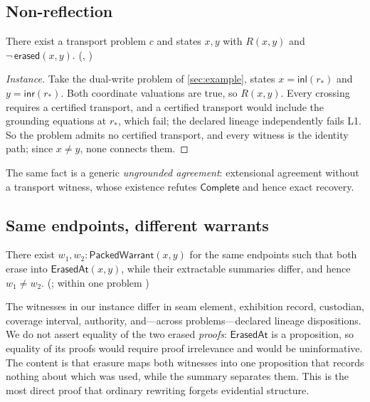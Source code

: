 \subsection{Non-reflection}
\begin{theorem}\label{thm:nonreflect}
There exist a transport problem $c$ and states $x,y$ with $R(x,y)$ and $\neg\,\mathsf{erased}(x,y)$. (, )
\end{theorem}
\begin{proof}[Instance]
Take the dual-write problem of \cref{sec:example}, states $x = \mathsf{inl}(r_*)$ and $y = \mathsf{inr}(r_*)$. Both coordinate valuations are true, so $R(x,y)$. Every crossing requires a certified transport, and a certified transport would include the grounding equations at $r_*$, which fail; the declared lineage independently fails L1. So the problem admits no certified transport, and every witness is the identity path; since $x \neq y$, none connects them.
\end{proof}
The same fact is a generic \emph{ungrounded agreement}: extensional agreement without a transport witness, whose existence refutes $\mathsf{Complete}$ and hence exact recovery.

\subsection{Same endpoints, different warrants}
\begin{theorem}\label{thm:multiplicity}
There exist $w_1, w_2 : \mathsf{PackedWarrant}(x,y)$ for the same endpoints such that both erase into $\mathsf{ErasedAt}(x,y)$, while their extractable summaries differ, and hence $w_1 \neq w_2$. (; within one problem )
\end{theorem}
The witnesses in our instance differ in seam element, exhibition record, custodian, coverage interval, authority, and---across problems---declared lineage dispositions. We do not assert equality of the two erased \emph{proofs}: $\mathsf{ErasedAt}$ is a proposition, so equality of its proofs would require proof irrelevance and would be uninformative. The content is that erasure maps both witnesses into one proposition that records nothing about which was used, while the summary separates them. This is the most direct proof that ordinary rewriting forgets evidential structure.
